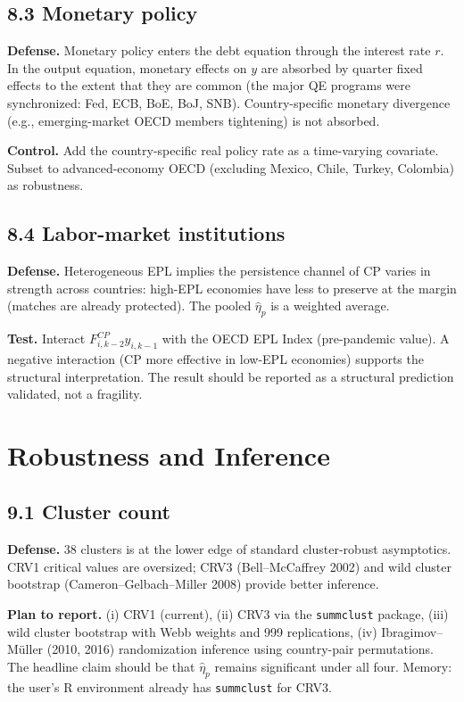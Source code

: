 \documentclass[11pt,a4paper]{article}
\begin{document}
\subsection*{8.3 Monetary policy}

\textbf{Defense.} Monetary policy enters the debt equation through the interest rate $r$. In the output equation, monetary effects on $y$ are absorbed by quarter fixed effects to the extent that they are common (the major QE programs were synchronized: Fed, ECB, BoE, BoJ, SNB). Country-specific monetary divergence (e.g., emerging-market OECD members tightening) is not absorbed.

\textbf{Control.} Add the country-specific real policy rate as a time-varying covariate. Subset to advanced-economy OECD (excluding Mexico, Chile, Turkey, Colombia) as robustness.

\subsection*{8.4 Labor-market institutions}

\textbf{Defense.} Heterogeneous EPL implies the persistence channel of CP varies in strength across countries: high-EPL economies have less to preserve at the margin (matches are already protected). The pooled $\hat\eta_p$ is a weighted average.

\textbf{Test.} Interact $F^{CP}_{i,k-2} y_{i,k-1}$ with the OECD EPL Index (pre-pandemic value). A negative interaction (CP more effective in low-EPL economies) supports the structural interpretation. The result should be reported as a structural prediction validated, not a fragility.

\section{Robustness and Inference}

\subsection*{9.1 Cluster count}

\textbf{Defense.} 38 clusters is at the lower edge of standard cluster-robust asymptotics. CRV1 critical values are oversized; CRV3 (Bell--McCaffrey 2002) and wild cluster bootstrap (Cameron--Gelbach--Miller 2008) provide better inference.

\textbf{Plan to report.} (i) CRV1 (current), (ii) CRV3 via the \texttt{summclust} package, (iii) wild cluster bootstrap with Webb weights and 999 replications, (iv) Ibragimov--M\"uller (2010, 2016) randomization inference using country-pair permutations. The headline claim should be that $\hat\eta_p$ remains significant under all four. Memory: the user's R environment already has \texttt{summclust} for CRV3.
\end{document}
